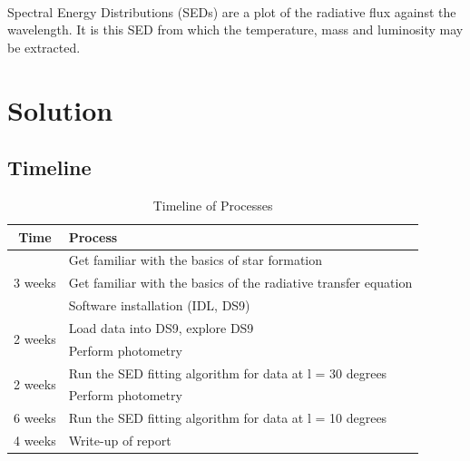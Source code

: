 \documentclass{article}
\begin{document}
\paragraph{}
Spectral Energy Distributions (SEDs) are a plot of the radiative flux against the wavelength. It is this SED from which the temperature, mass and luminosity may be extracted. 

\section{Solution}
\subsection{Timeline}

\begin{table}[h!]
  \begin{center}
    \caption{Timeline of Processes}
    \label{tab:table1}
    \begin{tabular}{c|l} %
      \toprule %
      \textbf{Time} & \textbf{Process}\\
      \midrule %
      \hline
      \multirow{3}{*}{3 weeks} & Get familiar with the basics of star formation\\ %
      & Get familiar with the basics of the radiative transfer equation\\ %
      & Software installation (IDL, DS9)\\ %
      \hline
      \multirow{2}{*}{2 weeks} & Load data into DS9, explore DS9\\ 
      & Perform photometry\\ 
      \hline
      \multirow{2}{*}{2 weeks} & Run the SED fitting algorithm for data at l = 30 degrees\\ 
      & Perform photometry\\ 
      \hline
      6 weeks & Run the SED fitting algorithm for data at l = 10 degrees\\
      \hline
      4 weeks & Write-up of report\\
      \bottomrule %
    \end{tabular}
  \end{center}
\end{table}
\end{document}
